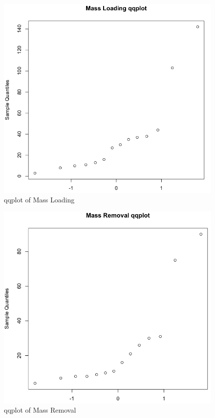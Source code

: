 \documentclass{article}
\begin{document}
	\begin{figure}[htb]
	   \centering
	   \includegraphics[width=\textwidth]{img/Problem2c_x.jpg} 
	   \caption{qqplot of Mass Loading}
	   \label{fig:loading_qqplot}
	\end{figure}
	
	\begin{figure}[htb]
	   \centering
	   \includegraphics[width=\textwidth]{img/Problem2c_y.jpg} 
	   \caption{qqplot of Mass Removal}
	   \label{fig:removal_qqplot}
	\end{figure}
\end{document}
